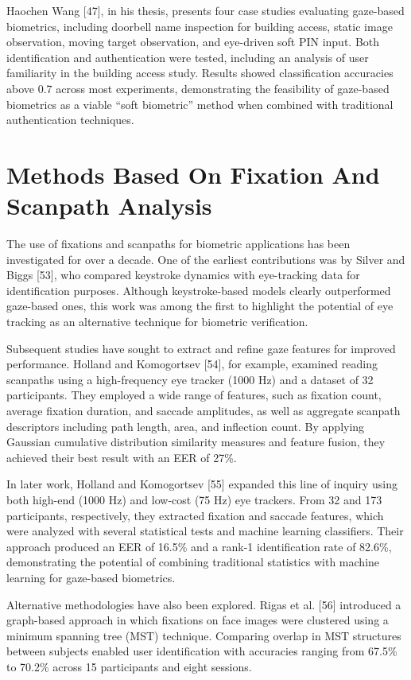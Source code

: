 \documentclass[12pt]{report}
\begin{document}
Haochen Wang [47], in his thesis, presents four case studies evaluating gaze-based biometrics, including doorbell name inspection for building access, static image observation, moving target observation, and eye-driven soft PIN input.
Both identification and authentication were tested, including an analysis of user familiarity in the building access study. 
Results showed classification accuracies above 0.7 across most experiments, demonstrating the feasibility of gaze-based biometrics as a viable “soft biometric” method when combined with traditional authentication techniques.

\section{Methods Based On Fixation And Scanpath Analysis}

The use of fixations and scanpaths for biometric applications has been investigated for over a decade.
One of the earliest contributions was by Silver and Biggs [53], who compared keystroke dynamics with eye-tracking data for identification purposes. 
Although keystroke-based models clearly outperformed gaze-based ones, this work was among the first to highlight the potential of eye tracking as an alternative technique for biometric verification.

Subsequent studies have sought to extract and refine gaze features for improved performance. 
Holland and Komogortsev [54], for example, examined reading scanpaths using a high-frequency eye tracker (1000 Hz) and a dataset of 32 participants. 
They employed a wide range of features, such as fixation count, average fixation duration, and saccade amplitudes, as well as aggregate scanpath descriptors including path length, area, and inflection count.
By applying Gaussian cumulative distribution similarity measures and feature fusion, they achieved their best result with an EER of 27\%. 

In later work, Holland and Komogortsev [55] expanded this line of inquiry using both high-end (1000 Hz) and low-cost (75 Hz) eye trackers. 
From 32 and 173 participants, respectively, they extracted fixation and saccade features, which were analyzed with several statistical tests and machine learning classifiers. 
Their approach produced an EER of 16.5\% and a rank-1 identification rate of 82.6\%, demonstrating the potential of combining traditional statistics with machine learning for gaze-based biometrics.

Alternative methodologies have also been explored. 
Rigas et al. [56] introduced a graph-based approach in which fixations on face images were clustered using a minimum spanning tree (MST) technique.
Comparing overlap in MST structures between subjects enabled user identification with accuracies ranging from 67.5\% to 70.2\% across 15 participants and eight sessions.
\end{document}
